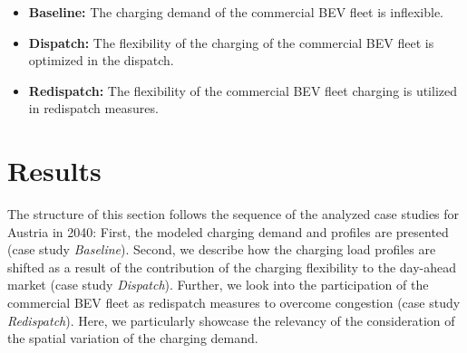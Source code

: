 \documentclass[final,10pt]{elsarticle}
\begin{document}
            \begin{itemize}
                \item \textbf{Baseline:} The charging demand of the commercial \ac{BEV} fleet is inflexible.
                \item \textbf{Dispatch:} The flexibility of the charging of the commercial \ac{BEV} fleet is optimized in the dispatch.
                \item \textbf{Redispatch:} The flexibility of the commercial \ac{BEV} fleet charging is utilized in redispatch measures.  
            \end{itemize}


\section{Results}

    The structure of this section follows the sequence of the analyzed case studies for Austria in 2040: First, the modeled charging demand and profiles are presented (case study \textit{Baseline}). Second, we describe how the charging load profiles are shifted as a result of the contribution of the charging flexibility to the day-ahead market (case study \textit{Dispatch}). Further, we look into the participation of the commercial \ac{BEV} fleet as redispatch measures to overcome congestion (case study \textit{Redispatch}). Here, we particularly showcase the relevancy of the consideration of the spatial variation of the charging demand.
    
\end{document}
